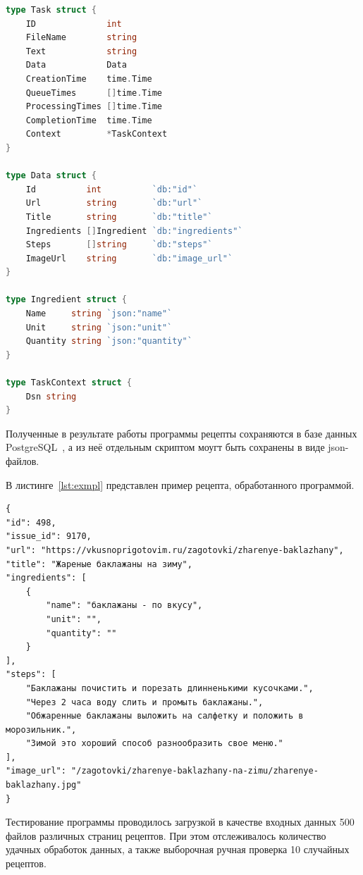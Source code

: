 \begin{lstlisting}[label=unit,caption={Данные, передающиеся между частями конвейера},language=go]
type Task struct {
	ID              int
	FileName        string
	Text            string
	Data            Data
	CreationTime    time.Time
	QueueTimes      []time.Time
	ProcessingTimes []time.Time
	CompletionTime  time.Time
	Context         *TaskContext
}

type Data struct {
	Id          int          `db:"id"`
	Url         string       `db:"url"`
	Title       string       `db:"title"`
	Ingredients []Ingredient `db:"ingredients"`
	Steps       []string     `db:"steps"`
	ImageUrl    string       `db:"image_url"`
}

type Ingredient struct {
	Name     string `json:"name"`
	Unit     string `json:"unit"`
	Quantity string `json:"quantity"`
}

type TaskContext struct {
	Dsn string
}
\end{lstlisting}

Полученные в результате работы программы рецепты сохраняются в базе данных PostgreSQL~\cite{pgs}, а из неё отдельным скриптом моугт быть сохранены в виде json-файлов.

\clearpage
{}

В листинге~\ref{lst:exmpl} представлен пример рецепта, обработанного программой.

\begin{lstlisting}[label=lst:exmpl,caption={Данные рецепта}]
{
"id": 498,
"issue_id": 9170,
"url": "https://vkusnoprigotovim.ru/zagotovki/zharenye-baklazhany",
"title": "Жареные баклажаны на зиму",
"ingredients": [
    {
        "name": "баклажаны - по вкусу",
        "unit": "",
        "quantity": ""
    }
],
"steps": [
    "Баклажаны почистить и порезать длинненькими кусочками.",
    "Через 2 часа воду слить и промыть баклажаны.",
    "Обжаренные баклажаны выложить на салфетку и положить в морозильник.",
    "Зимой это хороший способ разнообразить свое меню."
],
"image_url": "/zagotovki/zharenye-baklazhany-na-zimu/zharenye-baklazhany.jpg"
}
\end{lstlisting}

\clearpage
{}

Тестирование программы проводилось загрузкой в качестве входных данных 500 файлов различных страниц рецептов. При этом отслеживалось количество удачных обработок данных, а также выборочная ручная проверка 10 случайных рецептов. 

